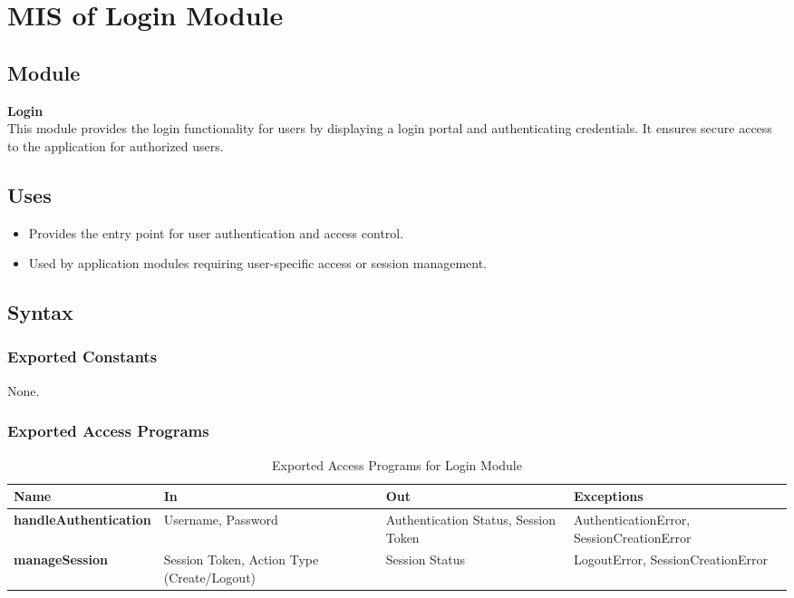 \documentclass[12pt, titlepage]{article}
\begin{document}
\newpage
\section{MIS of Login Module}

\subsection{Module}
\textbf{Login} \\
This module provides the login functionality for users by displaying a login portal and authenticating credentials. It ensures secure access to the application for authorized users.

\subsection{Uses}
\begin{itemize}
    \item Provides the entry point for user authentication and access control.
    \item Used by application modules requiring user-specific access or session management.
\end{itemize}

\subsection{Syntax}

\subsubsection{Exported Constants}
None.

\subsubsection{Exported Access Programs}

\begin{table}[h!]
\centering
\begin{tabular}{|p{4cm}|p{4cm}|p{4cm}|p{4cm}|}
    \hline
    \textbf{Name} & \textbf{In} & \textbf{Out} & \textbf{Exceptions} \\
    \hline
    \textbf{handleAuthentication} & Username, Password & Authentication Status, Session Token & AuthenticationError, SessionCreationError \\
    \hline
    \textbf{manageSession} & Session Token, Action Type (Create/Logout) & Session Status & LogoutError, SessionCreationError \\
    \hline
\end{tabular}
\caption{Exported Access Programs for Login Module}
\label{table:login}
\end{table}
\end{document}
